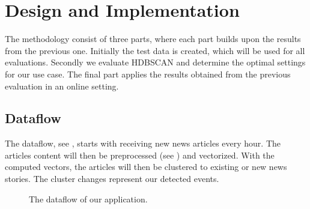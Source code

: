 \section{Design and Implementation}
\label{sec:4_design_and_implementation}

The methodology consist of three parts, where each part builds upon the results from the previous one.
Initially the test data is created, which will be used for all evaluations.
Secondly we evaluate HDBSCAN and determine the optimal settings for our use case.
The final part applies the results obtained from the previous evaluation in an online setting.

\subsection{Dataflow}
\label{subsec:4_dataflow}

The dataflow, see , starts with receiving new news articles every hour.
The articles content will then be preprocessed (see )
and vectorized.
With the computed vectors, the articles will then be clustered to existing or new news stories.
The cluster changes represent our detected events.

\begin{figure}[!htb]
    \centering

    \caption{The dataflow of our application.}
    \label{fig:dataflow}
\end{figure}




